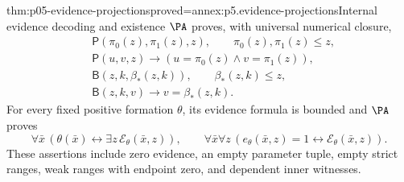 \begin{hblemma}{thm:p05-evidence-projections}{proved=annex:p5.evidence-projections}{Internal evidence decoding and existence}
\(\PA\) proves, with universal numerical closure,
\[
\begin{aligned}
 &\mathsf P(\pi_0(z),\pi_1(z),z),\qquad
                  \pi_0(z),\pi_1(z)\leq z,\\
 &\mathsf P(u,v,z)\to(u=\pi_0(z)\land v=\pi_1(z)),\\
 &\mathsf B(z,k,\beta_*(z,k)),\qquad \beta_*(z,k)\leq z,\\
 &\mathsf B(z,k,v)\to v=\beta_*(z,k).
\end{aligned}
\]
For every fixed positive formation \(\theta\), its evidence formula
is bounded and \(\PA\) proves
\[
 \forall\bar x\,
       (\theta(\bar x)\leftrightarrow
                         \exists z\,\mathcal E_\theta(\bar x,z)),
 \qquad
 \forall\bar x\forall z\,
       (e_\theta(\bar x,z)=1\leftrightarrow
                              \mathcal E_\theta(\bar x,z)).
\]
These assertions include zero evidence, an empty parameter tuple, empty
strict ranges, weak ranges with endpoint zero, and dependent inner witnesses.
\end{hblemma}

